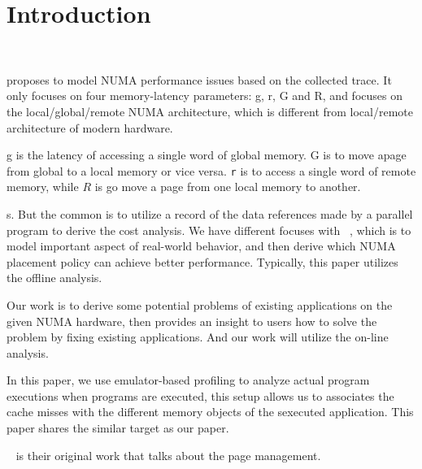 \section{Introduction}
\label{sec:intro}

~\cite{Bolosky:1991:NPR:106972.106994} 

proposes to model NUMA performance issues based on the collected trace. It only focuses on four memory-latency parameters: g, r, G and R, and focuses on the local/global/remote NUMA architecture, which is different from local/remote architecture of modern hardware. 

g is the latency of accessing a single word of  global memory. G is to move apage from global to a local memory or vice versa. \texttt{r} is to access a single word of remote memory, while  $R$ is go move a page from one local memory to another. 

s. 
But the common is to utilize a record of the data references made by a parallel program to derive the cost analysis. 
We have different focuses with ~\cite{Bolosky:1991:NPR:106972.106994}, which is to model important aspect of real-world behavior, and then derive which NUMA placement policy can achieve better performance. Typically, this paper utilizes the offline analysis.   

Our work is to derive some potential problems of existing applications on the given NUMA hardware, then provides an insight to users how to solve the problem by fixing existing applications. And our work will utilize the on-line analysis. 

In this paper, we use emulator-based profiling to analyze actual program executions when programs are executed, this setup allows us to associates the cache misses with the different memory objects of the sexecuted application. 
This paper shares the similar target as our paper. 

~\cite{Bolosky:1989:SBE:74850.74854} is their original work that talks about the page management. 

